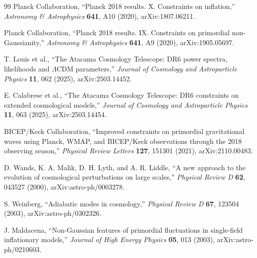 \documentclass[11pt]{article}
\numberwithin{equation}{section}
\theoremstyle{definition}
\theoremstyle{remark}
\begin{document}
\begin{thebibliography}{99}
Planck Collaboration,
``Planck 2018 results. X. Constraints on inflation,''
\emph{Astronomy \& Astrophysics} \textbf{641}, A10 (2020),
arXiv:1807.06211.

Planck Collaboration,
``Planck 2018 results. IX. Constraints on primordial non-Gaussianity,''
\emph{Astronomy \& Astrophysics} \textbf{641}, A9 (2020),
arXiv:1905.05697.

T. Louis et al.,
``The Atacama Cosmology Telescope: DR6 power spectra, likelihoods and $\Lambda$CDM parameters,''
\emph{Journal of Cosmology and Astroparticle Physics} \textbf{11}, 062 (2025),
arXiv:2503.14452.

E. Calabrese et al.,
``The Atacama Cosmology Telescope: DR6 constraints on extended cosmological models,''
\emph{Journal of Cosmology and Astroparticle Physics} \textbf{11}, 063 (2025),
arXiv:2503.14454.

BICEP/Keck Collaboration,
``Improved constraints on primordial gravitational waves using Planck, WMAP, and BICEP/Keck observations through the 2018 observing season,''
\emph{Physical Review Letters} \textbf{127}, 151301 (2021),
arXiv:2110.00483.

D. Wands, K. A. Malik, D. H. Lyth, and A. R. Liddle,
``A new approach to the evolution of cosmological perturbations on large scales,''
\emph{Physical Review D} \textbf{62}, 043527 (2000),
arXiv:astro-ph/0003278.

S. Weinberg,
``Adiabatic modes in cosmology,''
\emph{Physical Review D} \textbf{67}, 123504 (2003),
arXiv:astro-ph/0302326.

J. Maldacena,
``Non-Gaussian features of primordial fluctuations in single-field inflationary models,''
\emph{Journal of High Energy Physics} \textbf{05}, 013 (2003),
arXiv:astro-ph/0210603.

\end{thebibliography}
\end{document}
